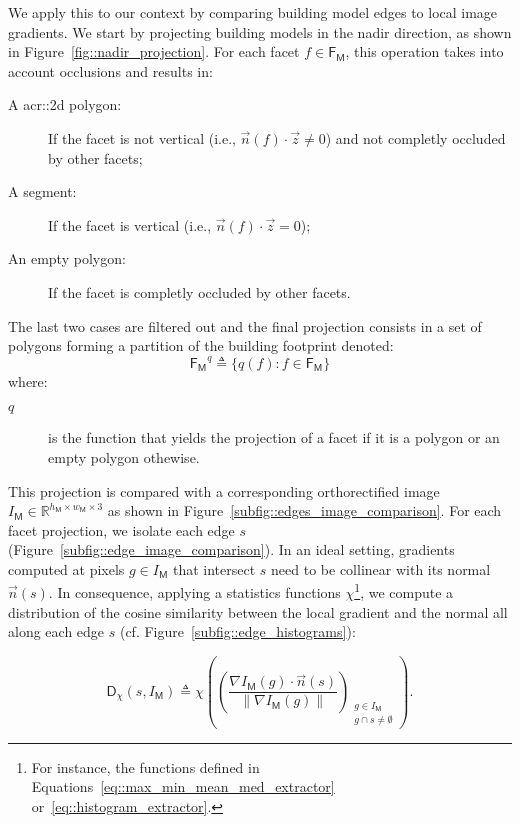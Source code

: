         We apply this to our context by comparing building model edges to local image gradients.
        We start by projecting building models in the nadir direction, as shown in Figure~\ref{fig::nadir_projection}.
        For each facet \(f \in \mathsf{F_M}\), this operation takes into account occlusions and results in:
        \begin{description}
            \item[A \gls{acr::2d} polygon:] If the facet is not vertical (i.e., \(\vec{n}(f) \cdot \vec{z} \neq 0\)) and not completly occluded by other facets;
            \item[A segment:] If the facet is vertical (i.e., \(\vec{n}(f) \cdot \vec{z} = 0\));
            \item[An empty polygon:] If the facet is completly occluded by other facets.
        \end{description}
        The last two cases are filtered out and the final projection consists in a set of polygons forming a partition of the building footprint denoted:
        \begin{equation}
            \label{eq::facet_projections}
            \mathsf{F_M}^q \triangleq \{q(f): f \in \mathsf{F_M}\}
        \end{equation}
        where:
        \begin{description}
            \item[\(q\)] is the function that yields the projection of a facet if it is a polygon or an empty polygon othewise.
        \end{description}

        This projection is compared with a corresponding orthorectified image \(I_{\mathsf{M}} \in \mathbb{R}^{h_{\mathsf{M}} \times w_{\mathsf{M}} \times 3}\) as shown in Figure~\ref{subfig::edges_image_comparison}.
        For each facet projection, we isolate each edge \(s\) (Figure~\ref{subfig::edge_image_comparison}).
        In an ideal setting, gradients computed at pixels $g \in I_{\mathsf{M}}$ that intersect \(s\) need to be collinear with its normal $\vec{n}(s)$.
        In consequence, applying a statistics functions $\chi$\footnote{
            For instance, the functions defined in Equations~\ref{eq::max_min_mean_med_extractor} or~\ref{eq::histogram_extractor}.
        }, we compute a distribution of the cosine similarity between the local gradient and the normal all along each edge \(s\) (cf. Figure~\ref{subfig::edge_histograms}):
        
        \begin{equation}
            \label{eq::corr_seg}
            \mathsf{D}_{\chi}(s, I_{\mathsf{M}}) \triangleq \chi \left( \left(\frac{\nabla I_{\mathsf{M}}\left(g\right) \cdot \vec{n}(s)}{\left\rVert \nabla I_{\mathsf{M}}\left(g\right)\right\rVert}\right)_{\substack{g \in I_{\mathsf{M}} \\ g \cap s \neq \emptyset}} \right).
        \end{equation}

